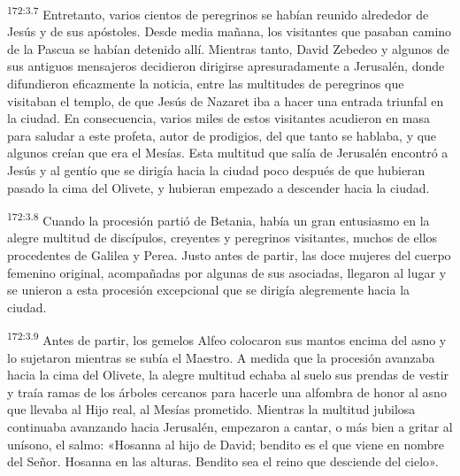 \par 
\textsuperscript{172:3.7} Entretanto, varios cientos de peregrinos se habían reunido alrededor de Jesús y de sus apóstoles. Desde media mañana, los visitantes que pasaban camino de la Pascua se habían detenido allí. Mientras tanto, David Zebedeo y algunos de sus antiguos mensajeros decidieron dirigirse apresuradamente a Jerusalén, donde difundieron eficazmente la noticia, entre las multitudes de peregrinos que visitaban el templo, de que Jesús de Nazaret iba a hacer una entrada triunfal en la ciudad. En consecuencia, varios miles de estos visitantes acudieron en masa para saludar a este profeta, autor de prodigios, del que tanto se hablaba, y que algunos creían que era el Mesías. Esta multitud que salía de Jerusalén encontró a Jesús y al gentío que se dirigía hacia la ciudad poco después de que hubieran pasado la cima del Olivete, y hubieran empezado a descender hacia la ciudad.

\par 
\textsuperscript{172:3.8} Cuando la procesión partió de Betania, había un gran entusiasmo en la alegre multitud de discípulos, creyentes y peregrinos visitantes, muchos de ellos procedentes de Galilea y Perea. Justo antes de partir, las doce mujeres del cuerpo femenino original, acompañadas por algunas de sus asociadas, llegaron al lugar y se unieron a esta procesión excepcional que se dirigía alegremente hacia la ciudad.

\par 
\textsuperscript{172:3.9} Antes de partir, los gemelos Alfeo colocaron sus mantos encima del asno y lo sujetaron mientras se subía el Maestro. A medida que la procesión avanzaba hacia la cima del Olivete, la alegre multitud echaba al suelo sus prendas de vestir y traía ramas de los árboles cercanos para hacerle una alfombra de honor al asno que llevaba al Hijo real, al Mesías prometido. Mientras la multitud jubilosa continuaba avanzando hacia Jerusalén, empezaron a cantar, o más bien a gritar al unísono, el salmo: «Hosanna al hijo de David; bendito es el que viene en nombre del Señor. Hosanna en las alturas. Bendito sea el reino que desciende del cielo».

